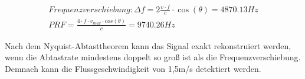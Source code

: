 \begin{align*}
    Frequenzverschiebung: \Delta f = 2 \frac{v \cdot f}{c} \cdot \cos(\theta) = 4870.13Hz \\
    PRF = \frac{4 \cdot f \cdot v_{max} \cdot cos(\theta)}{c} = 9740.26Hz
\end{align*}

Nach dem Nyquist-Abtasttheorem kann das Signal exakt rekonstruiert werden, wenn die Abtastrate mindestens doppelt so groß ist als die Frequenzverschiebung. 
Demnach kann die Flussgeschwindigkeit von 1,5m/s detektiert werden.
